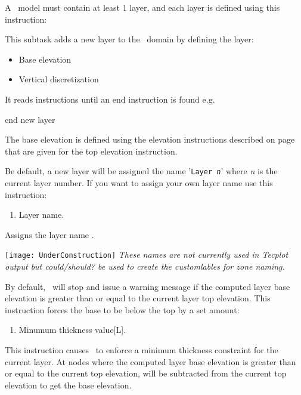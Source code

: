A \mfus\ model must contain at least 1 layer, and each layer is defined using this instruction:

    {
    This subtask adds a new layer to the \gwf\ domain by defining the layer:
     \begin{itemize}
       \item Base elevation
       \item Vertical discretization
     \end{itemize}

     It reads instructions until an \textsf{end} instruction is found e.g.\:

    {\Large \sf end new layer}
    }

The base elevation is defined using the elevation instructions  described on page~\pageref{'Page:TopElev'} that are given for the \textsf{top elevation} instruction.

Be default, a new layer will be assigned the name '\texttt{Layer {\em n}}' where {\em n} is the current layer number.  If you want to assign your own layer name use this instruction:

    { \squish
    \begin{enumerate}
    \item {} Layer name.
    \end{enumerate}
    Assigns the layer name .
    }

\texttt{[image: UnderConstruction]} \textit{These names are not currently used in Tecplot output but could/should? be used to create the customlables for zone naming.}
    
    

By default, \mut\ will stop and issue a warning message if the computed layer base elevation is greater than or equal to the current layer top elevation.  This instruction forces the base to be below the top by a set amount:

    {\squish
    \begin{enumerate}
    \item {} Minumum thickness value[L].
    \end{enumerate}
    This instruction causes \mut\ to enforce a minimum thickness constraint for the current layer. At nodes where the computed layer base elevation is greater than or equal to the current top elevation,  will
    be subtracted from the current top elevation to get the base elevation.
    }

